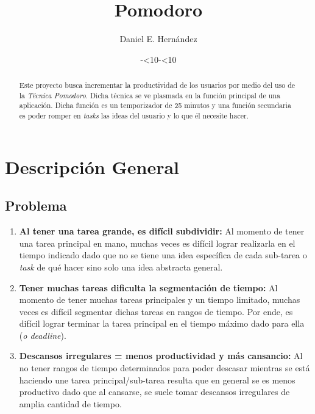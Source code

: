 \documentclass[]{article}
\title{\textbf{Pomodoro}}
\author{Daniel E. Hernández}
\date{\the\year-\ifnum\month<10\relax0\fi\the\month-\ifnum\day<10\relax0\fi\the\day}
\begin{document}
\maketitle

\begin{abstract}
Este proyecto busca incrementar la productividad de los usuarios por medio del uso de la \textit{Técnica Pomodoro}. Dicha técnica se ve plasmada en la función principal de una aplicación. Dicha función es un temporizador de 25 minutos y una función secundaria es poder romper en \textit{tasks} las ideas del usuario y lo que él necesite hacer. 
\end{abstract}

\section{Descripción General}
\subsection{Problema}
\begin{enumerate}
	\item \textbf{Al tener una tarea grande, es difícil subdividir:} Al momento de tener una tarea principal en mano, muchas veces es difícil lograr realizarla en el tiempo indicado dado que no se tiene una idea específica de cada sub-tarea o \textit{task} de qué hacer sino solo una idea abstracta general.
	
	\item \textbf{Tener muchas tareas dificulta la segmentación de tiempo:} Al momento de tener muchas tareas principales y un tiempo limitado, muchas veces es difícil segmentar dichas tareas en rangos de tiempo. Por ende, es difícil lograr terminar la tarea principal en el tiempo máximo dado para ella (\textit{o deadline}).

	\item \textbf{Descansos irregulares = menos productividad y más cansancio:} Al no tener rangos de tiempo determinados para poder descasar mientras se está haciendo une tarea principal/sub-tarea resulta que en general se es menos productivo dado que al cansarse, se suele tomar descansos irregulares de amplia cantidad de tiempo.
\end{enumerate}
\end{document}
